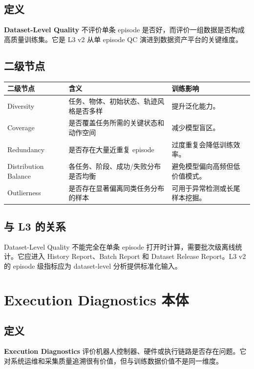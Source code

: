 \documentclass[UTF8,zihao=-4]{ctexart}
\newcommand{\Term}[1]{\textbf{#1}}
\begin{document}
\subsection{定义}

\Term{Dataset-Level Quality} 不评价单条 episode 是否好，而评价一组数据是否构成高质量训练集。它是 L3 v2 从单 episode QC 演进到数据资产平台的关键维度。

\subsection{二级节点}

\begin{longtable}{L{3.3cm} L{5cm} L{5.4cm}}
\toprule
二级节点 & 含义 & 训练影响 \\
\midrule
Diversity & 任务、物体、初始状态、轨迹风格是否多样 & 提升泛化能力。 \\
Coverage & 是否覆盖任务所需的关键状态和动作空间 & 减少模型盲区。 \\
Redundancy & 是否存在大量近重复 episode & 过度重复会降低训练效率。 \\
Distribution Balance & 各任务、阶段、成功/失败分布是否均衡 & 避免模型偏向高频但低价值模式。 \\
Outlierness & 是否存在显著偏离同类任务分布的样本 & 可用于异常检测或长尾样本挖掘。 \\
\bottomrule
\end{longtable}

\subsection{与 L3 的关系}

Dataset-Level Quality 不能完全在单条 episode 打开时计算，需要批次级离线统计。它应进入 History Report、Batch Report 和 Dataset Release Report。L3 v2 的 episode 级指标应为 dataset-level 分析提供标准化输入。

\section{Execution Diagnostics 本体}

\subsection{定义}

\Term{Execution Diagnostics} 评价机器人控制器、硬件或执行链路是否存在问题。它对系统运维和采集质量追溯很有价值，但与训练数据价值不是同一维度。
\end{document}
